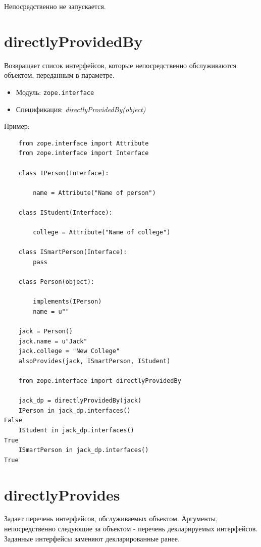 \documentclass[a4paper,openany,twoside,draft]{book}
\providecommand*{\DUroletitlereference}[1]{\textsl{#1}}
\begin{document}
Непосредственно не запускается.


\section*{directlyProvidedBy%
  \label{directlyprovidedby}%
}

Возвращает список интерфейсов, которые непосредственно обслуживаются объектом, переданным в параметре.

\begin{itemize}

\item Модуль: \texttt{zope.interface}

\item Спецификация: \DUroletitlereference{directlyProvidedBy(object)}

\end{itemize}

Пример:

\begin{verbatim}
    from zope.interface import Attribute
    from zope.interface import Interface

    class IPerson(Interface):

        name = Attribute("Name of person")

    class IStudent(Interface):

        college = Attribute("Name of college")

    class ISmartPerson(Interface):
        pass

    class Person(object):

        implements(IPerson)
        name = u""

    jack = Person()
    jack.name = u"Jack"
    jack.college = "New College"
    alsoProvides(jack, ISmartPerson, IStudent)

    from zope.interface import directlyProvidedBy

    jack_dp = directlyProvidedBy(jack)
    IPerson in jack_dp.interfaces()
False
    IStudent in jack_dp.interfaces()
True
    ISmartPerson in jack_dp.interfaces()
True
\end{verbatim}


\section*{directlyProvides%
  \label{directlyprovides}%
}

Задает перечень интерфейсов, обслуживаемых объектом.  Аргументы, непосредственно следующие за объектом - перечень декларируемых интерфейсов.  Заданные интерфейсы заменяют декларированные ранее.
\end{document}
